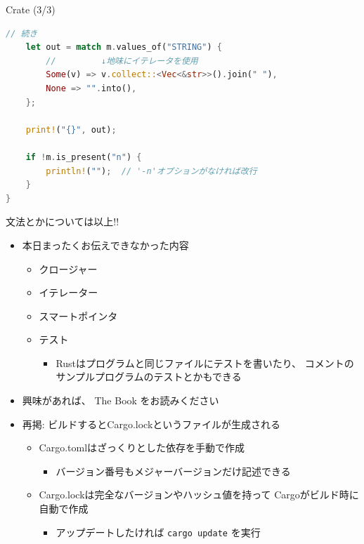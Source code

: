 \documentclass[cjk,dvipdfmx,10pt,compress,fragile%
hyperref={bookmarks=true,bookmarksnumbered=true,bookmarksopen=false,%
colorlinks=false,%
pdftitle={第 134 回 関西 Debian 勉強会},%
pdfauthor={小林},%
pdfsubject={資料},%
}]{beamer}
\begin{document}
\begin{frame}[t,fragile]{Crate (3/3)}
\begin{lstlisting}[language=Rust,style=boxed,style=colouredRust,basicstyle=\small\tt,lineskip=-2pt]
// 続き
    let out = match m.values_of("STRING") {
        //         ↓地味にイテレータを使用
        Some(v) => v.collect::<Vec<&str>>().join(" "),
        None => "".into(),
    };

    print!("{}", out);

    if !m.is_present("n") {
        println!("");  // '-n'オプションがなければ改行
    }
}\end{lstlisting}
\end{frame}

\begin{frame}[t,fragile]{文法とかについては以上!!}
\begin{itemize}
 \item 本日まったくお伝えできなかった内容
       \begin{itemize}
	\item クロージャー
	\item イテレーター
	\item スマートポインタ
	\item テスト
	      \begin{itemize}
	       \item Rustはプログラムと同じファイルにテストを書いたり、
		     コメントのサンプルプログラムのテストとかもできる
	      \end{itemize}
       \end{itemize}
 \item 興味があれば、 The Book をお読みください
 \item 再掲: ビルドするとCargo.lockというファイルが生成される
       \begin{itemize}
	\item Cargo.tomlはざっくりとした依存を手動で作成
	      \begin{itemize}
	       \item バージョン番号もメジャーバージョンだけ記述できる
	      \end{itemize}
	\item Cargo.lockは完全なバージョンやハッシュ値を持って
	      Cargoがビルド時に自動で作成
	      \begin{itemize}
	       \item アップデートしたければ \verb|cargo update| を実行
	      \end{itemize}
       \end{itemize}
\end{itemize}
\end{frame}
\end{document}
